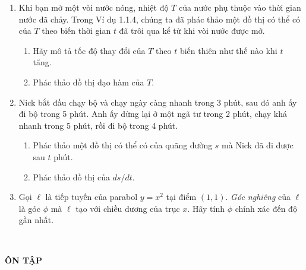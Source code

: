 \documentclass[10pt,letterpaper]{article}
\begin{document}
\hfill
\begin{minipage}[t]{0.485\textwidth}
\begin{enumerate}[label=\textbf{\arabic*.}, leftmargin=1.5em, start=66, itemsep=6pt, topsep=0pt]
    \item Khi bạn mở một vòi nước nóng, nhiệt độ $T$ của nước phụ thuộc vào thời gian nước đã chảy. Trong Ví dụ 1.1.4, chúng ta đã phác thảo một đồ thị có thể có của $T$ theo biến thời gian $t$ đã trôi qua kể từ khi vòi nước được mở.
    \begin{enumerate}[label=(\alph*), leftmargin=1.6em, itemsep=1.5pt, topsep=2pt]
        \item Hãy mô tả tốc độ thay đổi của $T$ theo $t$ biến thiên như thế nào khi $t$ tăng.
        \item Phác thảo đồ thị đạo hàm của $T$.
    \end{enumerate}

    \item Nick bắt đầu chạy bộ và chạy ngày càng nhanh trong 3 phút, sau đó anh ấy đi bộ trong 5 phút. Anh ấy dừng lại ở một ngã tư trong 2 phút, chạy khá nhanh trong 5 phút, rồi đi bộ trong 4 phút.
    \begin{enumerate}[label=(\alph*), leftmargin=1.6em, itemsep=1.5pt, topsep=2pt]
        \item Phác thảo một đồ thị có thể có của quãng đường $s$ mà Nick đã đi được sau $t$ phút.
        \item Phác thảo đồ thị của $ds/dt$.
    \end{enumerate}

    \item Gọi $\ell$ là tiếp tuyến của parabol $y = x^2$ tại điểm $(1, 1)$. \textit{Góc nghiêng} của $\ell$ là góc $\phi$ mà $\ell$ tạo với chiều dương của trục $x$. Hãy tính $\phi$ chính xác đến độ gần nhất.
\end{enumerate}
\end{minipage}

\vspace{10pt}

\noindent
\begingroup
\setlength{\fboxsep}{0pt}%
\colorbox{bannerdark}{\parbox[c][22pt][c]{24pt}{\centering\textcolor{white}{\fontsize{13}{15}\selectfont\textbf{\textsf{2}}}}}%
\colorbox{bannerlight}{\parbox[c][22pt][c]{\dimexpr\textwidth-24pt\relax}{\hspace{10pt}\fontsize{12}{14}\selectfont\textbf{\textsf{ÔN TẬP}}}}%
\endgroup
\end{document}
